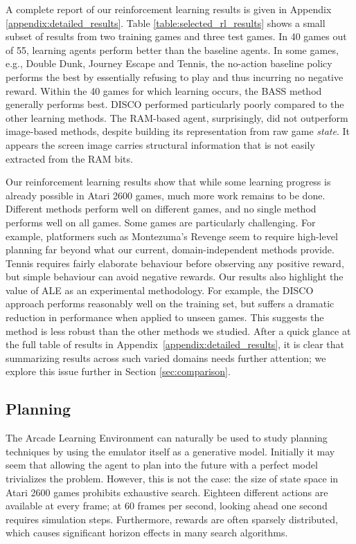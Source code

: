 \documentclass[twoside,11pt]{article}
\newcommand{\gamename}[1]{{\sc #1}}
\begin{document}
A complete report of our reinforcement learning results is given in Appendix 
\ref{appendix:detailed_results}. Table \ref{table:selected_rl_results} shows a small subset of 
results from two training games and three test games.  In 40 games out of 55, learning agents perform 
better than the baseline agents.  In some games, e.g., \gamename{Double Dunk}, \gamename{Journey Escape} and \gamename{Tennis}, the no-action baseline policy performs the best by essentially refusing to play and thus incurring no negative reward.  Within the 40 games for which learning occurs, the BASS method
generally performs best. DISCO performed particularly poorly compared to the other learning methods. 
The RAM-based agent, surprisingly, did not outperform image-based methods, despite building its representation from raw game {\em state}. It appears the screen image carries structural information that is not easily extracted from the RAM bits.

Our reinforcement learning results show that while some learning progress is already possible in Atari 2600 games, much more work remains to be done. 
Different methods perform well on different games, and no single method performs well on all games. 
Some games are particularly challenging.  For example, platformers such as \gamename{Montezuma's Revenge} seem to require high-level planning far beyond what our current, domain-independent methods provide.  \gamename{Tennis} requires fairly elaborate behaviour before observing any positive reward, but simple behaviour can avoid negative rewards.  Our results also highlight the value of ALE as an experimental methodology.
For example, the DISCO approach performs reasonably well on the training set, but suffers a dramatic reduction in performance when applied to unseen games.
This suggests the method is less robust than the other methods we studied.  After a quick glance at the full table of results in Appendix~\ref{appendix:detailed_results}, it is clear that summarizing results across such varied domains needs further attention; we explore this issue further in Section \ref{sec:comparison}. 

\subsection{Planning}
\label{sec:planning}

The Arcade Learning Environment can naturally be used to study planning techniques by using the emulator itself as a generative model. 
Initially it may seem that allowing the agent to plan into the future with a perfect model trivializes the problem.
However, this is not the case: the size of state space in Atari 2600 games prohibits exhaustive search. 
Eighteen different actions are available at every frame; at 60 frames per second, looking ahead one second requires  simulation steps.
Furthermore, rewards are often sparsely distributed, which causes significant horizon effects in many search algorithms. 
\end{document}
